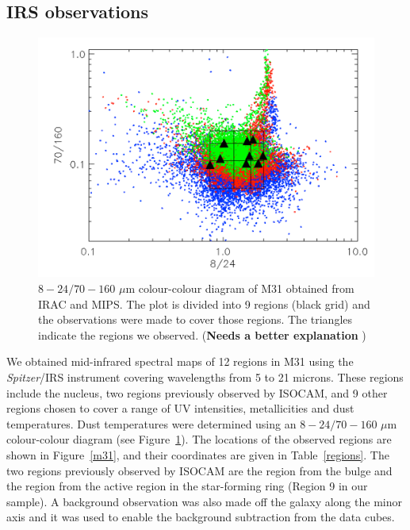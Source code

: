 \subsection{IRS observations}
\label{sect:irs_obs}

\begin{figure}
\centering
\includegraphics[width = 8 cm]{./colormaps.png}
\caption{$8 - 24/70 - 160$ $\mu$m colour-colour diagram of M31 obtained from IRAC and MIPS. The plot is divided into 9 regions (black grid) and the observations were made to cover those regions. The triangles indicate the regions we observed. ({\bf Needs a better explanation} )}
\label{colourmaps}
\end{figure}

We obtained mid-infrared spectral maps of 12 regions in M31 using the {\em Spitzer}/IRS instrument \citep{IRS2004} covering wavelengths from 5 to 21 microns. 
These regions include the nucleus, two regions previously observed by ISOCAM, and 9 other regions chosen to cover a range of UV intensities, 
metallicities and dust temperatures. Dust temperatures were determined using an $8 - 24/70 - 160$ $\mu$m colour-colour diagram 
(see Figure~\ref{colourmaps}). The locations of the observed regions are shown in Figure~\ref{m31}, and 
their coordinates are given in Table~\ref{regions}. The two regions previously observed by ISOCAM are the region from the bulge and the 
region from the active region in the star-forming ring (Region 9 in our sample). A background observation was also made off the galaxy 
along the minor axis and it was used to enable the background subtraction from the data cubes.


